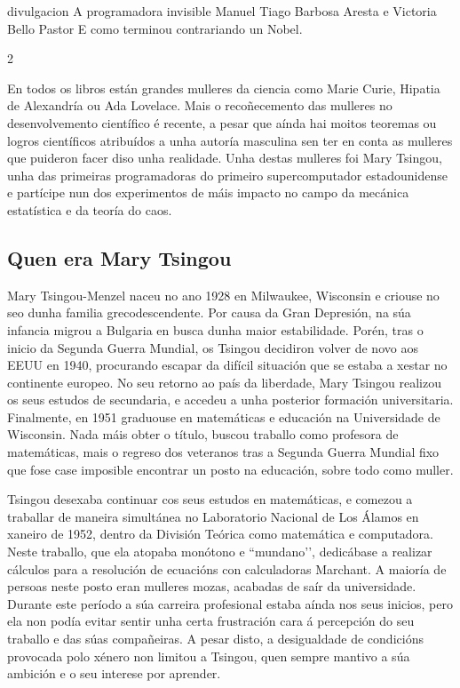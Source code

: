 \Titular%
{divulgacion}%
{A programadora invisible}%
{Manuel Tiago Barbosa Aresta e Victoria Bello Pastor}%
{E como terminou contrariando un Nobel.}%


\begin{multicols}{2}


En todos os libros están grandes mulleres da ciencia como Marie Curie, Hipatia
de Alexandría ou Ada Lovelace. Mais o recoñecemento das mulleres no
desenvolvemento científico é recente, a pesar que aínda hai moitos teoremas ou
logros científicos atribuídos a unha autoría masculina sen ter en conta as
mulleres que puideron facer diso unha realidade. Unha destas mulleres foi Mary
Tsingou, unha das primeiras programadoras do primeiro supercomputador
estadounidense e partícipe nun dos experimentos de máis impacto no campo da
mecánica estatística e da teoría do caos.

\subsection*{Quen era Mary Tsingou}

Mary Tsingou-Menzel naceu no ano 1928 en Milwaukee, Wisconsin e criouse no seo
dunha familia grecodescendente. Por causa da Gran Depresión, na súa infancia
migrou a Bulgaria en busca dunha maior estabilidade. Porén, tras o inicio da
Segunda Guerra Mundial, os Tsingou decidiron volver de novo aos EEUU en 1940,
procurando escapar da difícil situación que se estaba a xestar no continente
europeo. No seu retorno ao país da liberdade, Mary Tsingou realizou os seus
estudos de secundaria, e accedeu a unha posterior formación universitaria.
Finalmente, en 1951 graduouse en matemáticas e educación na Universidade de
Wisconsin. Nada máis obter o título, buscou traballo como profesora de
matemáticas, mais o regreso dos veteranos tras a Segunda Guerra Mundial fixo
que fose case imposible encontrar un posto na educación, sobre todo como
muller.

Tsingou desexaba continuar cos seus estudos en matemáticas, e comezou a
traballar de maneira simultánea no Laboratorio Nacional de Los Álamos en
xaneiro de 1952, dentro da División Teórica como matemática e computadora.
Neste traballo, que ela atopaba monótono e ``mundano’’, dedicábase a realizar
cálculos para a resolución de ecuacións con calculadoras Marchant. A maioría de
persoas neste posto eran mulleres mozas, acabadas de saír da universidade.
Durante este período a súa carreira profesional estaba aínda nos seus inicios,
pero ela non podía evitar sentir unha certa frustración cara á
percepción do seu traballo e das súas compañeiras. A pesar disto, a
desigualdade de condicións provocada polo xénero non limitou a Tsingou, quen
sempre mantivo a súa ambición e o seu interese por aprender.


\end{multicols}
